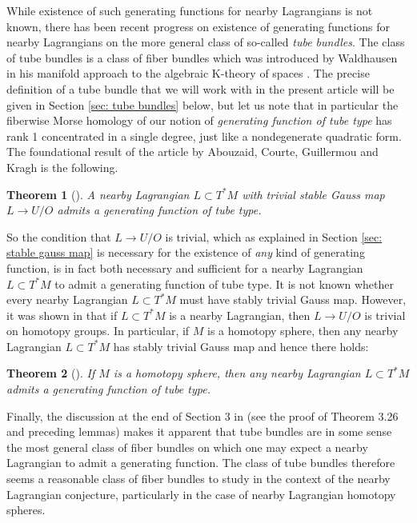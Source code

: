 \documentclass{amsart}
\newtheorem{theorem}{Theorem}[section]
\theoremstyle{definition}
\theoremstyle{remark}
\newtheorem{inductive lemma}[theorem]{Inductive Lemma}
\begin{document}
While existence of such generating functions for nearby Lagrangians is not known, there has been recent progress on existence of generating functions for nearby Lagrangians on the more general class of so-called {\em tube bundles}. The class of tube bundles is a class of fiber bundles which was introduced by Waldhausen in his manifold approach to the algebraic K-theory of spaces \cite{W82}. The precise definition of a tube bundle that we will work with in the present article will be given in Section \ref{sec: tube bundles} below, but let us note that in particular the fiberwise Morse homology of our notion of {\em generating function of tube type} has rank 1 concentrated in a single degree, just like a nondegenerate quadratic form.  The foundational result of the article \cite{ACGK} by Abouzaid, Courte, Guillermou and Kragh is the following. 

\begin{theorem}[\cite{ACGK}]\label{thm: existence generating functions tube}  A nearby Lagrangian $L \subset T^*M$ with trivial stable Gauss map $L \to U/O$ admits a generating function of tube type. \end{theorem}

So the condition that $L \to U/O$ is trivial, which as explained in Section \ref{sec: stable gauss map} is necessary for the existence of {\em any} kind of generating function, is in fact both necessary and sufficient for a nearby Lagrangian $L \subset T^*M$ to admit a generating function of tube type.  It is not known whether every nearby Lagrangian $L \subset T^*M$ must have stably trivial Gauss map. However, it was shown in \cite{ACGK} that if  $L \subset T^*M$ is a nearby Lagrangian, then $L \to U/O$ is trivial on homotopy groups.  In particular, if $M$ is a homotopy sphere, then any nearby Lagrangian $L \subset T^*M$ has stably trivial Gauss map and hence there holds:

\begin{theorem}[\cite{ACGK}] If $M$ is a homotopy sphere, then any nearby Lagrangian $L \subset T^*M$ admits a generating function of tube type. \end{theorem} 

Finally, the discussion at the end of Section 3 in \cite{ACGK}  (see the proof of Theorem 3.26 and preceding lemmas) makes it apparent that tube bundles are in some sense the most general class of fiber bundles on which one may expect a nearby Lagrangian to admit a generating function. The class of tube bundles therefore seems a reasonable class of fiber bundles to study in the context of the nearby Lagrangian conjecture, particularly in the case of nearby Lagrangian homotopy spheres. 
\end{document}
